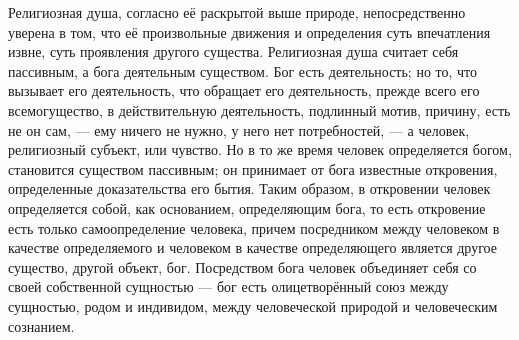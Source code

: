 \documentclass[12pt,oneside]{book}
\begin{document}
Религиозная душа, согласно её раскрытой выше природе, непосредственно уверена в том, что её произвольные движения и определения суть впечатления извне, суть проявления другого существа. Религиозная душа считает себя пассивным, а бога деятельным существом. Бог есть деятельность; но то, что вызывает его деятельность, что обращает его деятельность, прежде всего его всемогущество, в действительную деятельность, подлинный мотив, причину, есть не он сам, --- ему ничего не нужно, у него нет потребностей, --- а человек, религиозный субъект, или чувство. Но в то же время человек определяется богом, становится существом пассивным; он принимает от бога известные откровения, определенные доказательства его бытия. Таким образом, в откровении человек определяется собой, как основанием, определяющим бога, то есть откровение есть только самоопределение человека, причем посредником между человеком в качестве определяемого и человеком в качестве определяющего является другое существо, другой объект, бог. Посредством бога человек объединяет себя со своей собственной сущностью --- бог есть олицетворённый союз между сущностью, родом и индивидом, между человеческой природой и человеческим сознанием.
\end{document}
